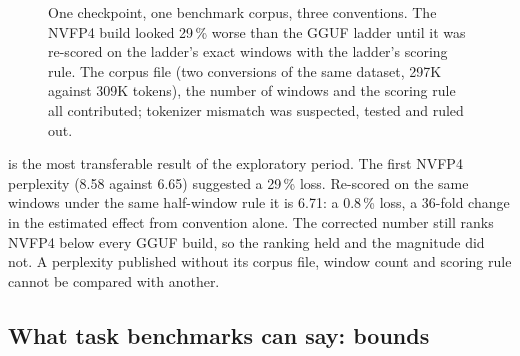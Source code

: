 \begin{figure}[t]
\centering
{}
\caption{One checkpoint, one benchmark corpus, three conventions\hist. The NVFP4 build looked 29\,\%
worse than the GGUF ladder until it was re-scored on the ladder's exact windows with the ladder's
scoring rule. The corpus file (two conversions of the same dataset, 297K against 309K tokens), the
number of windows and the scoring rule all contributed; tokenizer mismatch was suspected, tested and
ruled out.}\label{fig:swing}
\end{figure}

 is the most transferable result of the exploratory period. The first NVFP4 perplexity
(8.58 against 6.65) suggested a 29\,\% loss. Re-scored on the same windows under the same half-window
rule it is 6.71: a 0.8\,\% loss, a 36-fold change in the estimated effect from convention alone. The
corrected number still ranks NVFP4 below every GGUF build, so the ranking held and the magnitude did
not. A perplexity published without its corpus file, window count and scoring rule cannot be compared
with another.

\subsection{What task benchmarks can say: bounds}\label{sec:bounds}


